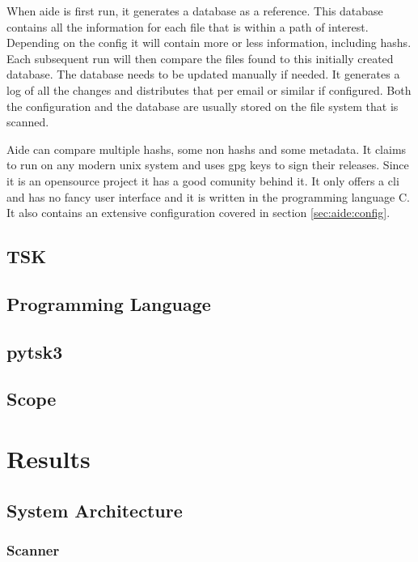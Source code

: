 \documentclass[
	a4paper,					%
	10pt,							%
	twoside,					%
	openright,				%
	notitlepage,			%
	parskip=half,			%
]{scrreprt}					%
\begin{document}
When aide is first run, it generates a database as a reference. This database contains all the information for each file that is within a path of interest. Depending on the config it will contain more or less information, including \glspl{hash}. Each subsequent run will then compare the files found to this initially created database. The database needs to be updated manually if needed. It generates a log of all the changes and distributes that per email or similar if configured. Both the configuration and the database are usually stored on the file system that is scanned. \cite{aide, aide:doc}

Aide can compare multiple \glspl{hash}, some non \glspl{hash} and some \gls{metadata}. It claims to run on any modern unix system \cite{aide} and uses gpg keys to sign their releases. Since it is an \gls{opensource} project it has a good comunity behind it. It only offers a \gls{cli} and has no fancy user interface and it is written in the programming language C. \cite{aide:github} It also contains an extensive configuration covered in section \ref{sec:aide:config}.

\section{TSK}

\section{Programming Language}

\section{pytsk3}

\section{Scope}

\chapter{Results}

\section{System Architecture}

\subsection{Scanner}
\end{document}

